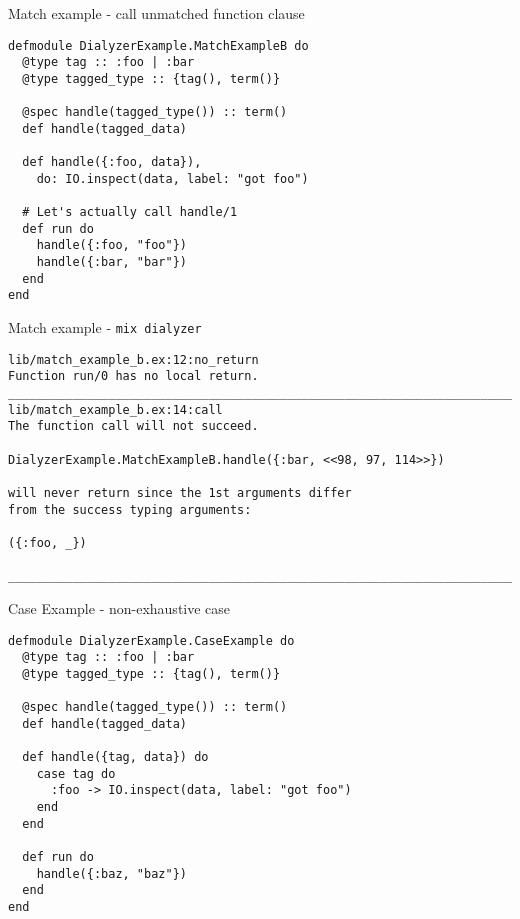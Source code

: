 \documentclass[
  ignorenonframetext,
]{beamer}
\newcommand{\passthrough}[1]{#1}
\begin{document}
\begin{frame}[fragile]{Match example - call unmatched function clause}
\protect\hypertarget{match-example---call-unmatched-function-clause}{}
\begin{lstlisting}
defmodule DialyzerExample.MatchExampleB do
  @type tag :: :foo | :bar
  @type tagged_type :: {tag(), term()}

  @spec handle(tagged_type()) :: term()
  def handle(tagged_data)

  def handle({:foo, data}),
    do: IO.inspect(data, label: "got foo")

  # Let's actually call handle/1
  def run do
    handle({:foo, "foo"})
    handle({:bar, "bar"})
  end
end
\end{lstlisting}
\end{frame}

\begin{frame}[fragile]{Match example -
\passthrough{\lstinline!mix dialyzer!}}
\protect\hypertarget{match-example---mix-dialyzer}{}
\begin{lstlisting}
lib/match_example_b.ex:12:no_return
Function run/0 has no local return.
________________________________________________________________________________
lib/match_example_b.ex:14:call
The function call will not succeed.

DialyzerExample.MatchExampleB.handle({:bar, <<98, 97, 114>>})

will never return since the 1st arguments differ
from the success typing arguments:

({:foo, _})

________________________________________________________________________________
\end{lstlisting}
\end{frame}

\begin{frame}[fragile]{Case Example - non-exhaustive case}
\protect\hypertarget{case-example---non-exhaustive-case}{}
\begin{lstlisting}
defmodule DialyzerExample.CaseExample do
  @type tag :: :foo | :bar
  @type tagged_type :: {tag(), term()}

  @spec handle(tagged_type()) :: term()
  def handle(tagged_data)

  def handle({tag, data}) do
    case tag do
      :foo -> IO.inspect(data, label: "got foo")
    end
  end

  def run do
    handle({:baz, "baz"})
  end
end
\end{lstlisting}
\end{frame}
\end{document}
